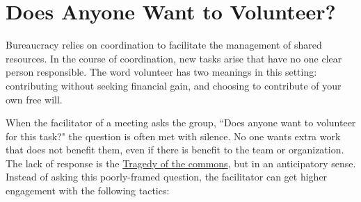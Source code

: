 \section{Does Anyone Want to Volunteer?}

Bureaucracy relies on coordination to facilitate the management of shared resources. In the course of coordination, new tasks arise that have no one clear person responsible. The word volunteer has two meanings in this setting: contributing without seeking financial gain, and choosing to contribute of your own free will. 


When the facilitator of a meeting asks the group, ``Does anyone want to volunteer for this task?" the question is often met with silence. No one wants extra work that does not benefit them, even if there is benefit to the team or organization. 
The lack of response is the \href{https://en.wikipedia.org/wiki/Tragedy_of_the_commons}{Tragedy of the commons}, 
but in an anticipatory sense.
Instead of asking this poorly-framed question, the facilitator can get higher engagement with the following tactics:
